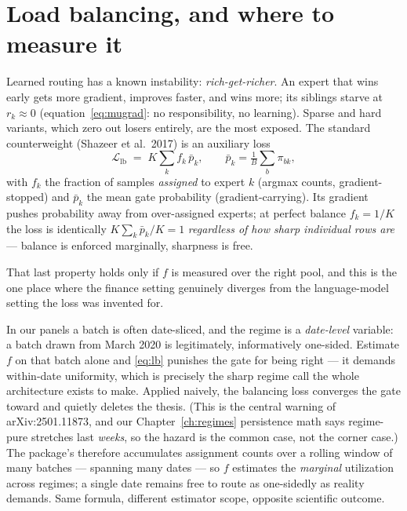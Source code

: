 \section{Load balancing, and where to measure it}
\label{sec:loadbalance}

Learned routing has a known instability: \emph{rich-get-richer}. An
expert that wins early gets more gradient, improves faster, and wins
more; its siblings starve at $r_k \approx 0$
(equation~\eqref{eq:mugrad}: no responsibility, no learning). Sparse and
hard variants, which zero out losers entirely, are the most exposed. The
standard counterweight (Shazeer et al.\ 2017) is an auxiliary loss
\begin{equation}\label{eq:lb}
  \mathcal{L}_{\mathrm{lb}}
  \;=\; K \sum_{k} f_k\, \bar p_k,
  \qquad
  \bar p_k = \tfrac{1}{B}\textstyle\sum_b \pi_{bk},
\end{equation}
with $f_k$ the fraction of samples \emph{assigned} to expert $k$
(argmax counts, gradient-stopped) and $\bar p_k$ the mean gate
probability (gradient-carrying). Its gradient pushes probability away
from over-assigned experts; at perfect balance $f_k = 1/K$ the loss is
identically $K \sum_k \bar p_k / K = 1$ \emph{regardless of how sharp
individual rows are} --- balance is enforced marginally, sharpness is
free.

That last property holds only if $f$ is measured over the right pool,
and this is the one place where the finance setting genuinely diverges
from the language-model setting the loss was invented for.

\begin{whatbreaks}
In our panels a batch is often date-sliced, and the regime is a
\emph{date-level} variable: a batch drawn from March 2020 is
legitimately, informatively one-sided. Estimate $f$ on that batch alone
and \eqref{eq:lb} punishes the gate for being right --- it demands
within-date uniformity, which is precisely the sharp regime call the
whole architecture exists to make. Applied naively, the balancing loss
converges the gate toward  and quietly deletes the thesis.
(This is the central warning of arXiv:2501.11873, and our
Chapter~\ref{ch:regimes} persistence math says regime-pure stretches
last \emph{weeks}, so the hazard is the common case, not the corner
case.) The package's  therefore accumulates
assignment counts over a rolling window of many batches --- spanning
many dates --- so $f$ estimates the \emph{marginal} utilization across
regimes; a single date remains free to route as one-sidedly as reality
demands. Same formula, different estimator scope, opposite scientific
outcome.
\end{whatbreaks}

